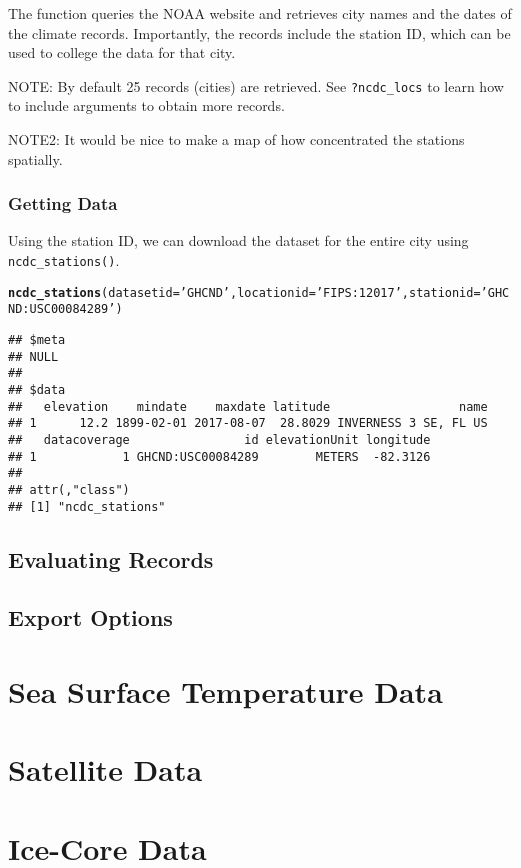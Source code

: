 \documentclass{article}\usepackage[]{graphicx}\usepackage[]{color}
\makeatletter
\newcommand{\hlstr}[1]{\textcolor[rgb]{0.192,0.494,0.8}{#1}}%
\newcommand{\hlstd}[1]{\textcolor[rgb]{0.345,0.345,0.345}{#1}}%
\newcommand{\hlkwc}[1]{\textcolor[rgb]{0.333,0.667,0.333}{#1}}%
\newcommand{\hlkwd}[1]{\textcolor[rgb]{0.737,0.353,0.396}{\textbf{#1}}}%
\newenvironment{kframe}{%
 \def\at@end@of@kframe{}%
 \ifinner\ifhmode%
  \def\at@end@of@kframe{\end{minipage}}%
  \begin{minipage}{\columnwidth}%
 \fi\fi%
 \def\FrameCommand##1{\hskip\@totalleftmargin \hskip-\fboxsep
 \colorbox{shadecolor}{##1}\hskip-\fboxsep
     \hskip-\linewidth \hskip-\@totalleftmargin \hskip\columnwidth}%
 \MakeFramed {\advance\hsize-\width
   \@totalleftmargin\z@ \linewidth\hsize
   \@setminipage}}%
 {\par\unskip\endMakeFramed%
 \at@end@of@kframe}
\newenvironment{knitrout}{}{} %
\makeatother
\begin{document}
The function queries the NOAA website and retrieves city names and the dates of the climate records. Importantly, the records include the station ID, which can be used to college the data for that city. 

NOTE: By default 25 records (cities) are retrieved. See \texttt{?ncdc_locs} to learn how to include arguments to obtain more records.  

NOTE2: It would be nice to make a map of how concentrated the stations spatially. 

\subsubsection{Getting Data}

Using the station ID, we can download the dataset for the entire city using \texttt{ncdc_stations()}. 
\begin{knitrout}
\color{fgcolor}\begin{kframe}
\begin{alltt}
\hlkwd{ncdc_stations}\hlstd{(}\hlkwc{datasetid}\hlstd{=}\hlstr{'GHCND'}\hlstd{,} \hlkwc{locationid}\hlstd{=}\hlstr{'FIPS:12017'}\hlstd{,} \hlkwc{stationid}\hlstd{=}\hlstr{'GHCND:USC00084289'}\hlstd{)}
\end{alltt}
\begin{verbatim}
## $meta
## NULL
## 
## $data
##   elevation    mindate    maxdate latitude                  name
## 1      12.2 1899-02-01 2017-08-07  28.8029 INVERNESS 3 SE, FL US
##   datacoverage                id elevationUnit longitude
## 1            1 GHCND:USC00084289        METERS  -82.3126
## 
## attr(,"class")
## [1] "ncdc_stations"
\end{verbatim}
\end{kframe}
\end{knitrout}

\subsection{Evaluating Records}

\subsection{Export Options}

\section{Sea Surface Temperature Data}

\section{Satellite Data}

\section{Ice-Core Data}
\end{document}

